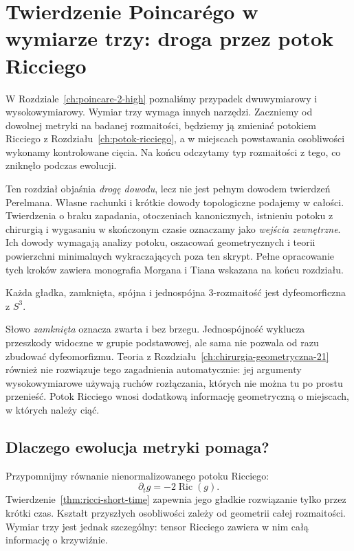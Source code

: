 \chapter{Twierdzenie Poincarégo w wymiarze trzy: droga przez potok Ricciego}
\label{ch:poincare-trzy}

W Rozdziale~\ref{ch:poincare-2-high} poznaliśmy przypadek
dwuwymiarowy i wysokowymiarowy. Wymiar trzy wymaga innych
narzędzi. Zaczniemy od dowolnej metryki na badanej
rozmaitości, będziemy ją zmieniać potokiem Ricciego
z Rozdziału~\ref{ch:potok-ricciego}, a w miejscach powstawania
osobliwości wykonamy kontrolowane cięcia. Na końcu
odczytamy typ rozmaitości z tego, co zniknęło podczas
ewolucji.

Ten rozdział objaśnia \emph{drogę dowodu}, lecz nie jest
pełnym dowodem twierdzeń Perelmana. Własne rachunki i krótkie
dowody topologiczne podajemy w całości. Twierdzenia o braku
zapadania, otoczeniach kanonicznych, istnieniu potoku
z chirurgią i wygasaniu w skończonym czasie oznaczamy
jako \emph{wejścia zewnętrzne}. Ich dowody wymagają analizy
potoku, oszacowań geometrycznych i teorii powierzchni
minimalnych wykraczających poza ten skrypt. Pełne opracowanie
tych kroków zawiera monografia Morgana i Tiana wskazana
na końcu rozdziału.

\begin{twierdzenie}
\label{thm:poincare-trzy}
Każda gładka, zamknięta, spójna i jednospójna
$3$-rozmaitość jest dyfeomorficzna z $S^3$.
\end{twierdzenie}

Słowo \emph{zamknięta} oznacza zwarta i bez brzegu.
Jednospójność wyklucza przeszkody widoczne w grupie
podstawowej, ale sama nie pozwala od razu zbudować
dyfeomorfizmu. Teoria z Rozdziału~\ref{ch:chirurgia-geometryczna-21}
również nie rozwiązuje tego zagadnienia automatycznie:
jej argumenty wysokowymiarowe używają ruchów rozłączania,
których nie można tu po prostu przenieść. Potok Ricciego
wnosi dodatkową informację geometryczną o miejscach,
w których należy ciąć.

\section{Dlaczego ewolucja metryki pomaga?}
\label{sec:poincare3-pierwsze-rachunki}

Przypomnijmy równanie nienormalizowanego potoku Ricciego:
\begin{equation}\label{eq:poincare3-ricci}
 \partial_tg=-2\operatorname{Ric}(g).
\end{equation}
Twierdzenie~\ref{thm:ricci-short-time} zapewnia jego
gładkie rozwiązanie tylko przez krótki czas. Kształt
przyszłych osobliwości zależy od geometrii całej
rozmaitości. Wymiar trzy jest jednak szczególny: tensor
Ricciego zawiera w nim całą informację o krzywiźnie.

